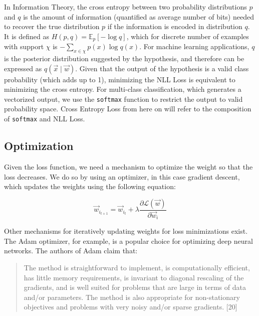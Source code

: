 \documentclass[12pt,a4paper,]{report}
\begin{document}
In Information Theory, the cross entropy between two probability
distributions \(p\) and \(q\) is the amount of information (quantified
as average number of bits) needed to recover the true distribution \(p\)
if the information is encoded in distribution \(q\). It is defined as
\(H(p, q) = \mathbb{E}_p[- \log q]\), which for discrete number of
examples with support \(\chi\) is
\(- \sum_{x \in \chi} p(x) \log q(x)\). For machine learning
applications, \(q\) is the posterior distribution suggested by the
hypothesis, and therefore can be expressed as
\(q(\vec{x} \mid \vec{w})\). Given that the output of the hypothesis is
a valid class probability (which adds up to 1), minimizing the NLL Loss
is equivalent to minimizing the cross entropy. For multi-class
classification, which generates a vectorized output, we use the
\texttt{softmax} function to restrict the output to valid probability
space. Cross Entropy Loss from here on will refer to the composition of
\texttt{softmax} and NLL Loss.

\hypertarget{optimization}{%
\subsection{Optimization}\label{optimization}}

Given the loss function, we need a mechanism to optimize the weight so
that the loss decreases. We do so by using an optimizer, in this case
gradient descent, which updates the weights using the following
equation:

\begin{equation}
    \vec{w}_{i_{t+1}} = \vec{w}_{i_{t}} + \lambda \frac{\partial \mathcal{L}(\vec{w})}{\partial \vec{w}_i} \label{eq:opt}
\end{equation}

Other mechanisms for iteratively updating weights for loss minimizations
exist. The Adam optimizer, for example, is a popular choice for
optimizing deep neural networks. The authors of Adam claim that:

\begin{quote}
The method is straightforward to implement, is computationally
efficient, has little memory requirements, is invariant to diagonal
rescaling of the gradients, and is well suited for problems that are
large in terms of data and/or parameters. The method is also appropriate
for non-stationary objectives and problems with very noisy and/or sparse
gradients. {[}20{]}
\end{quote}
\end{document}

